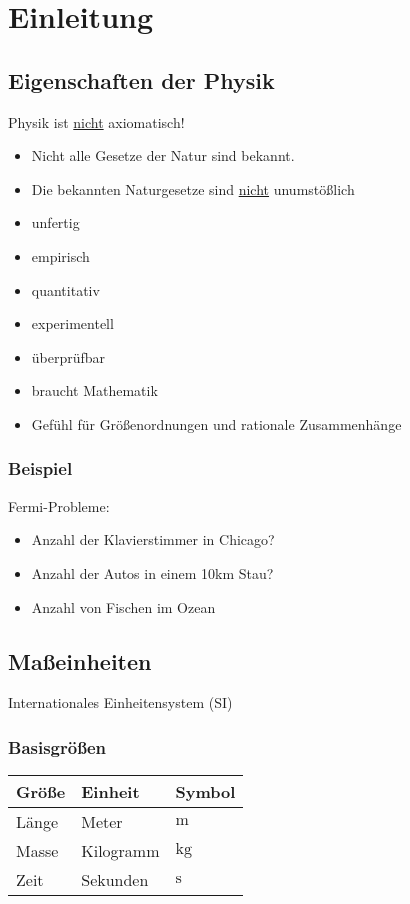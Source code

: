 \documentclass[a4paper]{scrartcl}
\theoremstyle{definition}
\theoremstyle{plain}
\theoremstyle{plain}
\theoremstyle{remark}
\theoremstyle{remark}
\theoremstyle{remark}
\begin{document}
\section{Einleitung}
\label{sec-1}
\subsection{Eigenschaften der Physik}
\label{sec-1-1}
Physik ist \uline{nicht} axiomatisch!
\begin{itemize}
\item Nicht alle Gesetze der Natur sind bekannt.
\item Die bekannten Naturgesetze sind \uline{nicht} unumstößlich
\item unfertig
\item empirisch
\item quantitativ
\item experimentell
\item überprüfbar
\item braucht Mathematik
\item Gefühl für Größenordnungen und rationale Zusammenhänge
\end{itemize}
\subsubsection{Beispiel}
\label{sec-1-1-1}
Fermi-Probleme:
\begin{itemize}
\item Anzahl der Klavierstimmer in Chicago?
\item Anzahl der Autos in einem 10km Stau?
\item Anzahl von Fischen im Ozean
\end{itemize}

\subsection{Maßeinheiten}
\label{sec-1-2}
Internationales Einheitensystem (SI)
\subsubsection{Basisgrößen}
\label{sec-1-2-1}
\begin{center}
\begin{tabular}{lll}
Größe & Einheit & Symbol\\
\hline
Länge & Meter & $\si{\meter}$\\
Masse & Kilogramm & $\si{\kg}$\\
Zeit & Sekunden & $\si{\second}$\\
\end{tabular}
\end{center}
\end{document}
